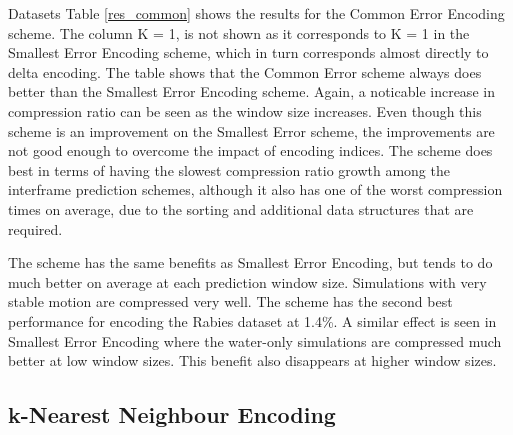\documentclass[a4paper,11pt]{report}
\begin{document}
\begin{section}{Datasets}
Table \ref{res_common} shows the results for the Common Error Encoding scheme. The column K = 1, is not shown as it corresponds to K = 1 in the Smallest Error Encoding scheme, which in turn corresponds almost directly to delta encoding. The table shows that the Common Error scheme always does better than the Smallest Error Encoding scheme. Again, a noticable increase in compression ratio can be seen as the window size increases. Even though this scheme is an improvement on the Smallest Error scheme, the improvements are not good enough to overcome the impact of encoding indices. The scheme does best in terms of having the slowest compression ratio growth among the interframe prediction schemes, although it also has one of the worst compression times on average, due to the sorting and additional data structures that are required. 

The scheme has the same benefits as Smallest Error Encoding, but tends to do much better on average at each prediction window size. Simulations with very stable motion are compressed very well. The scheme has the second best performance for encoding the Rabies dataset at 1.4\%. A similar effect is seen in Smallest Error Encoding where the water-only simulations are compressed much better at low window sizes. This benefit also disappears at higher window sizes.

\subsection{k-Nearest Neighbour Encoding} 


\end{section}
\end{document}

